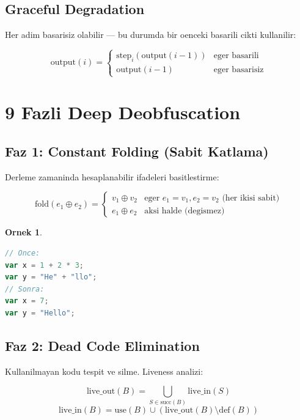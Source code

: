 \documentclass[12pt,a4paper,oneside]{book}
\theoremstyle{definition}
\newtheorem{example}{Ornek}[chapter]
\begin{document}
\subsection{Graceful Degradation}

Her adim basarisiz olabilir --- bu durumda bir oenceki basarili cikti kullanilir:

\begin{equation}
\text{output}(i) = \begin{cases}
\text{step}_i(\text{output}(i-1)) & \text{eger basarili} \\
\text{output}(i-1) & \text{eger basarisiz}
\end{cases}
\end{equation}

\section{9 Fazli Deep Deobfuscation}
\label{sec:deep-deobf}

\subsection{Faz 1: Constant Folding (Sabit Katlama)}

Derleme zamaninda hesaplanabilir ifadeleri basitlestirme:

\begin{equation}
\text{fold}(e_1 \oplus e_2) = \begin{cases}
v_1 \oplus v_2 & \text{eger } e_1 = v_1, e_2 = v_2 \text{ (her ikisi sabit)} \\
e_1 \oplus e_2 & \text{aksi halde (degismez)}
\end{cases}
\end{equation}

\begin{example}
\begin{lstlisting}[language=JavaScript]
// Once:
var x = 1 + 2 * 3;
var y = "He" + "llo";
// Sonra:
var x = 7;
var y = "Hello";
\end{lstlisting}
\end{example}

\subsection{Faz 2: Dead Code Elimination}

Kullanilmayan kodu tespit ve silme. Liveness analizi:

\begin{equation}
\text{live\_out}(B) = \bigcup_{S \in \text{succ}(B)} \text{live\_in}(S)
\end{equation}
\begin{equation}
\text{live\_in}(B) = \text{use}(B) \cup (\text{live\_out}(B) \setminus \text{def}(B))
\end{equation}
\end{document}
